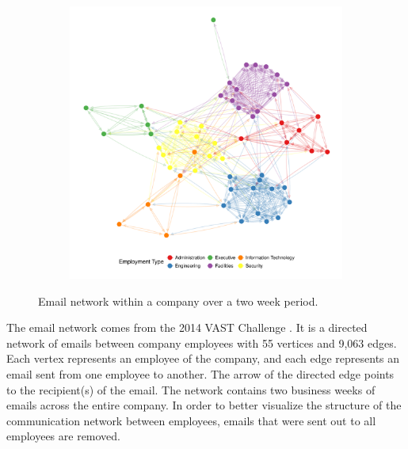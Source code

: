\begin{figure}[hbt]
\begin{subfigure}[t]{\textwidth}
\begin{adjustbox}{valign=t}
\begin{minipage}{.49\textwidth}
                   \end{minipage}

                  \begin{minipage}{.49\textwidth}

\includegraphics[width=\textwidth]{figure/email_ggnetwork-1.pdf}

                          \end{minipage}

                          \end{adjustbox}
\end{subfigure}

\caption{\label{fig.cap:email} Email network within a company over a two week period.}
\end{figure}
\afterpage{\clearpage}

The email network comes from the 2014 VAST Challenge \citep{emailnet}. It is a directed network of emails between company employees with 55 vertices and 9,063 edges. Each vertex represents an employee of the company, and each edge represents an email sent from one employee to another. The arrow of the directed edge points to the recipient(s) of the email. The network contains two business weeks of emails across the entire company. In order to better visualize the structure of the communication network between employees, emails that were sent out to all employees are removed.

